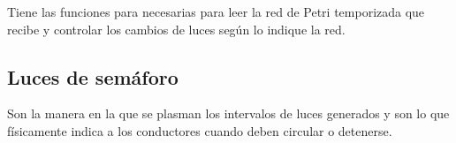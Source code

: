 Tiene las funciones para necesarias para leer la red de Petri
temporizada que recibe y controlar los cambios de luces según lo indique
la red.

\hypertarget{luces-de-semuxe1foro}{%
\subsection{Luces de semáforo}\label{luces-de-semuxe1foro}}

Son la manera en la que se plasman los intervalos de luces generados y
son lo que físicamente indica a los conductores cuando deben circular o
detenerse.

\clearpage %
